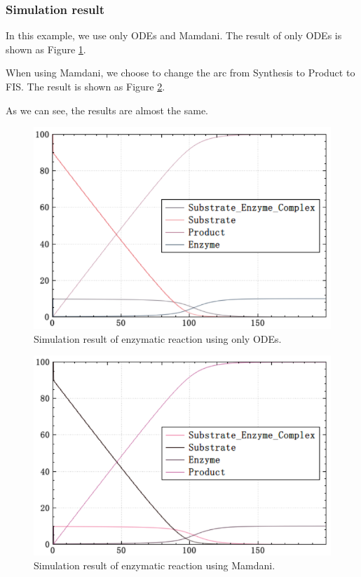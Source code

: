 \documentclass[journal,a4paper,onecolumn]{article}
\begin{document}
\subsubsection{Simulation result}
In this example, we use only ODEs and Mamdani. The result of only ODEs is shown as Figure \ref{fig:Simulation result of enzyme using only ODEs.}.

When using Mamdani, we choose to change the arc from Synthesis to Product to FIS. The result is shown as Figure \ref{fig:Simulation result of enzyme using Mamdani.}.

As we can see, the results are almost the same.

\begin{figure}[!hbt]
	\begin{center}
		\includegraphics[width=\columnwidth]{fig26}
		\caption{Simulation result of enzymatic reaction using only ODEs.}
		\label{fig:Simulation result of enzyme using only ODEs.}
	\end{center}
\end{figure}

\begin{figure}[!hbt]
	\begin{center}
		\includegraphics[width=\columnwidth]{fig27}
		\caption{Simulation result of enzymatic reaction using Mamdani.}
		\label{fig:Simulation result of enzyme using Mamdani.}
	\end{center}
\end{figure}
\end{document}

